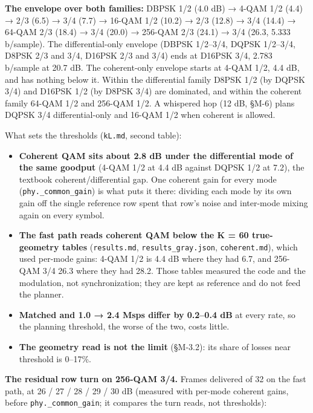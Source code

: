 \documentclass[10pt,letterpaper,twocolumn]{article}
\providecommand{\tightlist}{\setlength{\itemsep}{0pt}\setlength{\parskip}{0pt}}
\begin{document}
\textbf{The envelope over both families:} DBPSK 1/2 (4.0 dB) → 4-QAM 1/2 (4.4) → 2/3 (6.5) → 3/4 (7.7) → 16-QAM 1/2 (10.2) → 2/3 (12.8) → 3/4 (14.4) → 64-QAM 2/3 (18.4) → 3/4 (20.0) → 256-QAM 2/3 (24.1) → 3/4 (26.3, 5.333 b/sample). The differential-only envelope (DBPSK 1/2--3/4, DQPSK 1/2--3/4, D8PSK 2/3 and 3/4, D16PSK 2/3 and 3/4) ends at D16PSK 3/4, 2.783 b/sample at 20.7 dB. The coherent-only envelope starts at 4-QAM 1/2, 4.4 dB, and has nothing below it. Within the differential family D8PSK 1/2 (by DQPSK 3/4) and D16PSK 1/2 (by D8PSK 3/4) are dominated, and within the coherent family 64-QAM 1/2 and 256-QAM 1/2. A whispered hop (12 dB, §M-6) plans DQPSK 3/4 differential-only and 16-QAM 1/2 when coherent is allowed.

What sets the thresholds (\texttt{kL.\allowbreak{}md}, second table):

\begin{itemize}
\tightlist
\item
  \textbf{Coherent QAM sits about 2.8 dB under the differential mode of the same goodput} (4-QAM 1/2 at 4.4 dB against DQPSK 1/2 at 7.2), the textbook coherent/differential gap. One coherent gain for every mode (\texttt{phy.\allowbreak{}\_\allowbreak{}common\_\allowbreak{}gain}) is what puts it there: dividing each mode by its own gain off the single reference row spent that row's noise and inter-mode mixing again on every symbol.
\item
  \textbf{The fast path reads coherent QAM below the K = 60 true-geometry tables} (\texttt{results.\allowbreak{}md}, \texttt{results\_\allowbreak{}gray.\allowbreak{}json}, \texttt{coherent.\allowbreak{}md}), which used per-mode gains: 4-QAM 1/2 is 4.4 dB where they had 6.7, and 256-QAM 3/4 26.3 where they had 28.2. Those tables measured the code and the modulation, not synchronization; they are kept as reference and do not feed the planner.
\item
  \textbf{Matched and 1.0 → 2.4 Msps differ by 0.2--0.4 dB} at every rate, so the planning threshold, the worse of the two, costs little.
\item
  \textbf{The geometry read is not the limit} (§M-3.2): its share of losses near threshold is 0--17\%.
\end{itemize}

\textbf{The residual row turn on 256-QAM 3/4.} Frames delivered of 32 on the fast path, at 26 / 27 / 28 / 29 / 30 dB (measured with per-mode coherent gains, before \texttt{phy.\allowbreak{}\_\allowbreak{}common\_\allowbreak{}gain}; it compares the turn reads, not thresholds):
\end{document}

